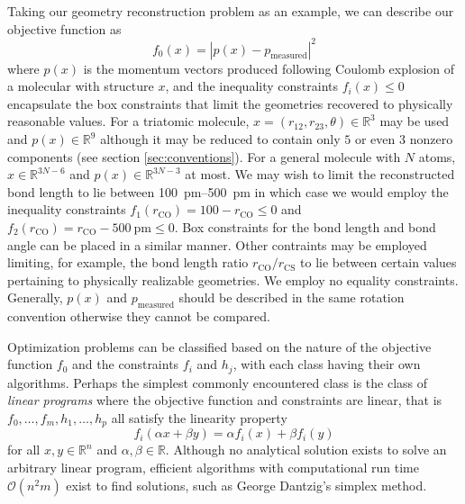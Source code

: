 Taking our geometry reconstruction problem as an example, we can describe our objective function as
\begin{equation} \label{eq:ourObjective}
f_0(x) = |p(x)-p_\textrm{measured}|^2
\end{equation}
where $p(x)$ is the momentum vectors produced following Coulomb explosion of a molecular with structure $x$, and the inequality constraints $f_i(x) \leq 0$ encapsulate the box constraints that limit the geometries recovered to physically reasonable values. For a triatomic molecule, $x = (r_{12}, r_{23}, \theta) \in \mathbb{R}^3$ may be used and $p(x) \in \mathbb{R}^9$ although it may be reduced to contain only $5$ or even $3$ nonzero components (see section \ref{sec:conventions}). For a general molecule with $N$ atoms, $x \in \mathbb{R}^{3N-6}$ and $p(x) \in \mathbb{R}^{3N-3}$ at most. We may wish to limit the reconstructed  bond length to lie between \SIrange{100}{500}{\pico\m} in which case we would employ the inequality constraints $f_1(r_\mathrm{CO}) =  100 - r_\mathrm{CO} \le 0$ and $f_2(r_\mathrm{CO}) =  r_\mathrm{CO} - \SI{500}{\pico\m} \le 0$. Box constraints for the  bond length and bond angle can be placed in a similar manner. Other contraints may be employed limiting, for example, the bond length ratio $r_\mathrm{CO}/r_\mathrm{CS}$ to lie between certain values pertaining to physically realizable geometries. We employ no equality constraints. Generally, $p(x)$ and $p_\textrm{measured}$ should be described in the same rotation convention otherwise they cannot be compared.

Optimization problems can be classified based on the nature of the objective function $f_0$ and the constraints $f_i$ and $h_j$, with each class having their own algorithms. Perhaps the simplest commonly encountered class is the class of \emph{linear programs} where the objective function and constraints are linear, that is $f_0, \dots, f_m, h_1, \dots, h_p$ all satisfy the linearity property
\begin{equation}
f_i(\alpha x + \beta y) = \alpha f_i(x) + \beta f_i(y)
\end{equation}
for all $x,y \in \mathbb{R}^n$ and $\alpha, \beta \in \mathbb{R}$. Although no analytical solution exists to solve an arbitrary linear program, efficient algorithms with computational run time $\mathcal{O}(n^2m)$ exist to find solutions, such as George Dantzig's simplex method.

